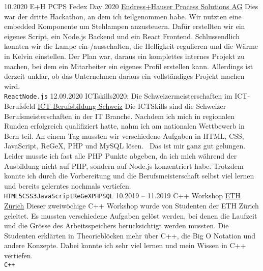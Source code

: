 \documentclass[9pt]{developercv} %
\begin{document}


\begin{entrylist}
	\entry
		{10.2020}
		{E+H PCPS Fedex Day 2020}
		{\href{https://endress.com}{Endress+Hauser Process Solutions AG}}
		{Dies war der dritte Hackathon, an dem ich teilgenommen habe. Wir nutzten eine embedded Komponente um Stehlampen anzusteuern. Dafür erstellten wir ein eigenes Script, ein Node.js Backend und ein React Frontend. Schlussendlich konnten wir die Lampe ein-/ausschalten, die Helligkeit regulieren und die Wärme in Kelvin einstellen. Der Plan war, daraus ein komplettes internes Projekt zu machen, bei dem ein Mitarbeiter ein eigenes Profil erstellen kann. Allerdings ist derzeit unklar, ob das Unternehmen daraus ein vollständiges Projekt machen wird.\\ \texttt{React}\slashsep\texttt{Node.js}}
	\entry
		{12.09.2020}
		{ICTskills2020: Die Schweizermeisterschaften im ICT-Berufsfeld}
		{\href{https://www.ict-berufsbildung.ch/}{ICT-Berufsbildung Schweiz}}
		{Die ICTSkills sind die Schweizer Berufsmeisterschaften in der IT Branche. Nachdem ich mich in regionalen Runden erfolgreich qualifiziert hatte, nahm ich am nationalen Wettbewerb in Bern teil.
    An einem Tag mussten wir verschiedene Aufgaben in HTML, CSS, JavaScript, ReGeX, PHP und MySQL lösen.  Das ist mir ganz gut gelungen. Leider musste ich fast alle PHP Punkte abgeben, da ich mich während der Ausbildung nicht auf PHP, sondern auf Node.js konzentriert habe.
    Trotzdem konnte ich durch die Vorbereitung und die Berufsmeisterschaft selbst viel lernen und bereits gelerntes nochmals vertiefen.\\ \texttt{HTML5}\slashsep\texttt{CSS3}\slashsep\texttt{JavaScript}\slashsep\texttt{ReGeX}\slashsep\texttt{PHP}\slashsep\texttt{SQL}}
	\entry
		{10.2019 -- 11.2019}
		{C++ Workshop}
		{\href{https://ethz.ch/}{ETH Zürich}}
		{Dieser zweiwöchige C++ Workshop wurde von Studenten der ETH Zürich geleitet. Es mussten verschiedene Aufgaben gelöst werden, bei denen die Laufzeit und die Grösse des Arbeitsspeichers berücksichtigt werden mussten. Die Studenten erklärten in Theorieblöcken mehr über C++, die Big O Notation und andere Konzepte. Dabei konnte ich sehr viel lernen und mein Wissen in C++ vertiefen.\\ \texttt{C++}}
	\entry

\end{entrylist}
\end{document}
